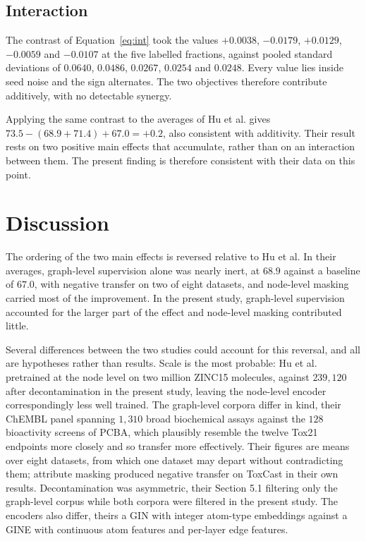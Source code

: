 \documentclass[11pt,a4paper]{article}
\begin{document}
\subsection{Interaction}

The contrast of Equation~\ref{eq:int} took the values $+0.0038$, $-0.0179$,
$+0.0129$, $-0.0059$ and $-0.0107$ at the five labelled fractions, against pooled standard
deviations of $0.0640$, $0.0486$, $0.0267$, $0.0254$ and $0.0248$. Every value
lies inside seed noise and the sign alternates. The two objectives therefore
contribute additively, with no detectable synergy.

Applying the same contrast to the averages of Hu et al. gives
$73.5 - (68.9 + 71.4) + 67.0 = +0.2$, also consistent with additivity. Their
result rests on two positive main effects that accumulate, rather than on an
interaction between them. The present finding is therefore consistent with their
data on this point.

\section{Discussion}

The ordering of the two main effects is reversed relative to Hu et al. In their
averages, graph-level supervision alone was nearly inert, at $68.9$ against a
baseline of $67.0$, with negative transfer on two of eight datasets, and
node-level masking carried most of the improvement. In the present study,
graph-level supervision accounted for the larger part of the effect and
node-level masking contributed little.

Several differences between the two studies could account for this reversal, and
all are hypotheses rather than results. Scale is the most probable: Hu et al.
pretrained at the node level on two million ZINC15 molecules, against $239{,}120$
after decontamination in the present study, leaving the node-level encoder
correspondingly less well trained. The graph-level corpora differ in kind, their
ChEMBL panel spanning $1{,}310$ broad biochemical assays against the $128$
bioactivity screens of PCBA, which plausibly resemble the twelve Tox21 endpoints
more closely and so transfer more effectively. Their figures are means over
eight datasets, from which one dataset may depart without contradicting them;
attribute masking produced negative transfer on ToxCast in their own results.
Decontamination was asymmetric, their Section 5.1 filtering only the graph-level
corpus while both corpora were filtered in the present study. The encoders also
differ, theirs a GIN with integer atom-type embeddings against a GINE with
continuous atom features and per-layer edge features.
\end{document}
